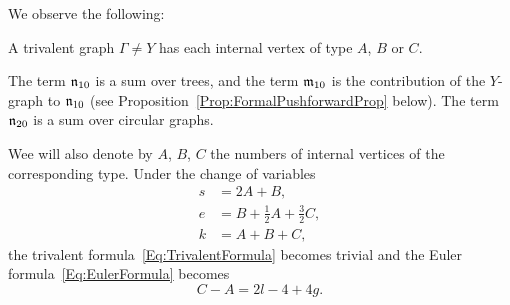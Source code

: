 \documentclass[\MainFolder/Text.tex]{subfiles}
\begin{document}
\begin{Remark}
We observe the following:
\begin{RemarkList}
\item A trivalent graph $\Gamma \neq Y$ has each internal vertex of type $A$, $B$ or $C$.
\item The term $\mathfrak{n}_{10}$ is a sum over trees, and the term $\mathfrak{m}_{10}$ is the contribution of the $Y$-graph to $\mathfrak{n}_{10}$ (see Proposition~\ref{Prop:FormalPushforwardProp} below). The term $\mathfrak{n}_{20}$ is a sum over circular graphs.\qedhere
\end{RemarkList}
\end{Remark}

Wee will also denote by $A$, $B$, $C$ the numbers of internal vertices of the corresponding type. Under the change of variables
\begin{equation} \label{Eq:ChangeOfVariables}
\begin{aligned}
  s &= 2 A + B, \\
  e &= B + \frac{1}{2} A + \frac{3}{2} C, \\
  k &= A + B + C,
\end{aligned}
\end{equation}
the trivalent formula~\eqref{Eq:TrivalentFormula} becomes trivial and the Euler formula~\eqref{Eq:EulerFormula} becomes
\begin{equation} \label{Eq:GenusFormulaa}
 C - A = 2l - 4 + 4g.
\end{equation}
\end{document}
